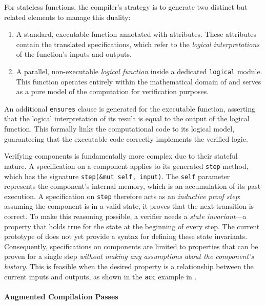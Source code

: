 For stateless \GRSync functions, the \GRust compiler's strategy is to generate two distinct but
related \Rust elements to manage this duality:
\begin{enumerate}
    \item A standard, executable \Rust function annotated with \Creusot attributes. These
          attributes contain the translated specifications, which refer to the \emph{logical
              interpretations} of the function's inputs and outputs.
    \item A parallel, non-executable \emph{logical function} inside a dedicated \texttt{logical}
          module. This function operates entirely within the mathematical domain of \Creusot and
          serves as a pure model of the computation for verification purposes.
\end{enumerate}
An additional \texttt{ensures} clause is generated for the executable function, asserting that the
logical interpretation of its result is equal to the output of the logical function. This formally
links the computational code to its logical model, guaranteeing that the executable code correctly
implements the verified logic.

Verifying components is fundamentally more complex due to their stateful nature. A specification on
a component applies to its generated \texttt{step} method, which has the signature
\texttt{step(\&mut self, input)}. The \texttt{self} parameter represents the component's internal
memory, which is an accumulation of its past execution.
%
A specification on \texttt{step} therefore acts as an \emph{inductive proof step}: assuming the
component is in a valid state, it proves that the next transition is correct. To make this reasoning
possible, a verifier needs a \emph{state invariant}---a property that holds true for the state at
the beginning of every step.
%
The current prototype of \GReusot does not yet provide a syntax for defining these state invariants.
Consequently, specifications on components are limited to properties that can be proven for a single
step \emph{without making any assumptions about the component's history}. This is feasible when the
desired property is a relationship between the current inputs and outputs, as shown in the
\texttt{acc} example in .

\paragraph{Augmented Compilation Passes}

